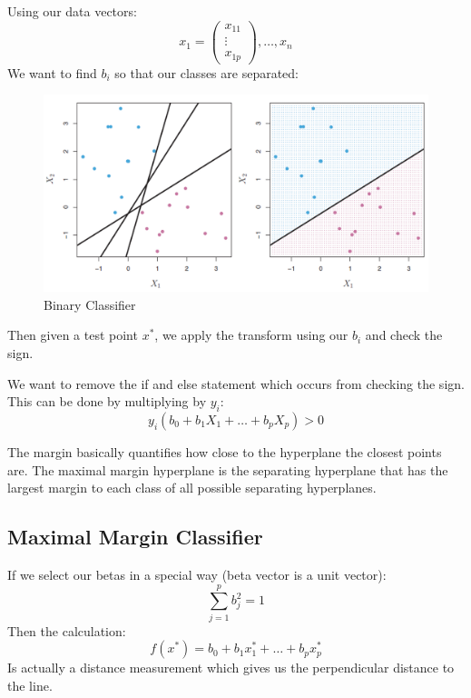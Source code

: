 \documentclass[../Main.tex]{subfiles}
\begin{document}

Using our data vectors:
\begin{equation*}
    x_1 = \begin{pmatrix}
        x_{11} \\
        \vdots \\
        x_{1p}
    \end{pmatrix}, \dots , x_n
\end{equation*}
We want to find \(b_i\) so that our classes are separated:
\begin{figure}[H]
    \centering
    \includegraphics[width=0.5\linewidth]{Images/max-margin-classifier.png}
    \caption{Binary Classifier}
\end{figure}

Then given a test point \(x^*\), we apply the transform using our \(b_i\) and
check the sign.

We want to remove the if and else statement which occurs from checking the sign.
This can be done by multiplying by \(y_i\):
\begin{equation*}
    y_i (b_0 + b_1 X_1 + \dots + b_p X_p) > 0
\end{equation*}

The margin basically quantifies how close to the hyperplane the closest points are.
The maximal margin hyperplane is the separating hyperplane that has the largest margin to each class of all 
possible separating hyperplanes.

\subsection{Maximal Margin Classifier}
If we select our betas in a special way (beta vector is a unit vector):
\begin{equation*}
    \sum_{j=1}^{p} b_j^2 = 1
\end{equation*}
Then the calculation:
\begin{equation*}
    f(x^*) = b_0 + b_1 x_1^* + \dots + b_p x_p^*
\end{equation*}
Is actually a distance measurement which gives us the perpendicular distance to the line.
\end{document}
